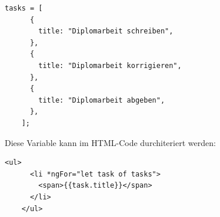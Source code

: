 \begin{lstlisting}[caption=Typescript Array]
    tasks = [
      {
        title: "Diplomarbeit schreiben",
      },
      {
        title: "Diplomarbeit korrigieren",
      },
      {
        title: "Diplomarbeit abgeben",
      },
    ];
\end{lstlisting}

Diese Variable kann im HTML-Code durchiteriert werden:

\begin{lstlisting}[caption=Angular Schleife]
    <ul>
      <li *ngFor="let task of tasks">
        <span>{{task.title}}</span>
      </li>
    </ul>
\end{lstlisting}

\cite{frontend_web_angular_introduction}


